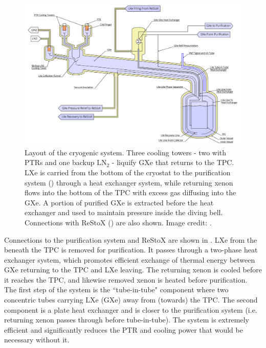\begin{figure}
\centering
\includegraphics[width=\textwidth]{CryostatSchematic}
\caption[Layout of the cryogenic system.]{Layout of the cryogenic system.  Three cooling towers - two with PTRs and one backup
$\mathrm{LN_2}$ - liquify GXe that returns
to the TPC.  LXe is carried from the bottom of the cryostat to the purification system () through a heat
exchanger system, while
returning xenon flows into the bottom of the TPC with excess gas diffusing into the GXe.  A portion of purified GXe is extracted
before the heat exchanger and used to maintain pressure inside the diving bell.  Connections with ReStoX ()
are also shown.  Image credit: .}
\label{fig:xenon1t_cryogenics_schematic}
\end{figure}

Connections to the purification system and ReStoX are shown in .  LXe from the beneath the TPC is
removed for purification.  It passes
through a two-phase heat exchanger system, which promotes efficient exchange of thermal energy between GXe returning to the TPC
and LXe leaving.  The returning xenon is cooled before it reaches the TPC, and likewise removed xenon is heated before
purification.  The first step of the system is the ``tube-in-tube" component where two concentric tubes carrying LXe (GXe) away from
(towards)
the TPC.  The second component is a plate heat exchanger and is closer to the purification system (i.e. returning xenon passes through
before tube-in-tube).  The system is extremely efficient and significantly reduces the PTR and  cooling power that would be
necessary without it.

